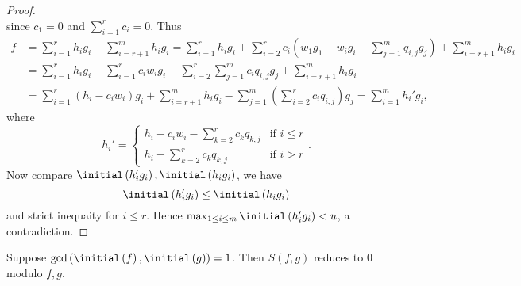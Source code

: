 \documentclass[co439]{subfiles}
\begin{document}
\begin{proof}
\begin{equation*}
        \end{equation*}
        since $c_1=0$ and $\sum^{r}_{i=1}c_i = 0$. Thus
        \begin{equation*}
            \begin{aligned}
                f & = \sum^{r}_{i=1} h_ig_i + \sum^{m}_{i=r+1} h_ig_i = \sum^{r}_{i=1}h_ig_i + \sum^{r}_{i=2} c_i\left( w_1g_1-w_ig_i-\sum^{m}_{j=1}q_{i,j}g_j \right) + \sum^{m}_{i=r+1} h_ig_i \\
                  & = \sum^{r}_{i=1} h_ig_i - \sum^{r}_{i=1} c_iw_ig_i - \sum^{r}_{i=2}\sum^{m}_{j=1}c_iq_{i,j}g_j + \sum^{m}_{i=r+1}h_ig_i \\
                  & = \sum^{r}_{i=1} \left( h_i-c_iw_i \right)g_i + \sum^{m}_{i=r+1}h_ig_i - \sum^{m}_{j=1} \left( \sum^{r}_{i=2} c_iq_{i,j}\right) g_j = \sum^{m}_{i=1} h_i'g_i,
            \end{aligned} 
        \end{equation*}
        where
        \begin{equation*}
            h_i' =
            \begin{cases} h_i-c_iw_i-\sum^{r}_{k=2}c_kq_{k,j}&\text{if $i\leq r$} \\ h_i-\sum^{r}_{k=2}c_kq_{k,j} & \text{if $i>r$} \end{cases}.
        \end{equation*}
        Now compare $\initial\left( h_i'g_i \right) , \initial\left( h_ig_i \right)$, we have
        \begin{equation*}
            \initial\left( h_i'g_i \right) \leq \initial\left( h_ig_i \right)
        \end{equation*}
        and strict inequaity for $i\leq r$. Hence $\max_{1\leq i\leq m}\initial\left( h_i'g_i \right)<u$, a contradiction.
    \end{proof}
    
    \begin{lemma}{}
        Suppose $\gcd\left( \initial\left( f \right),\initial\left( g \right) \right)=1$. Then $S\left( f,g \right)$ reduces to $0$ modulo $f,g$.
    \end{lemma}
\end{document}
